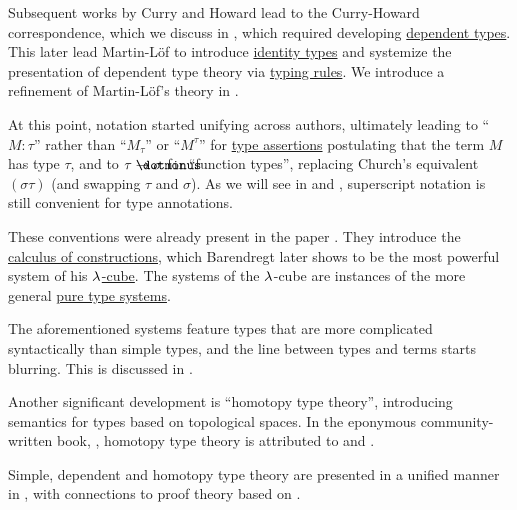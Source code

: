\begin{remark}
  Subsequent works by Curry and Howard lead to the Curry-Howard correspondence, which we discuss in , which required developing \hyperref[con:dependent_type]{dependent types}. This later lead Martin-Löf to introduce \hyperref[def:identity_type]{identity types} and systemize the presentation of dependent type theory via \hyperref[con:typing_rule]{typing rules}. We introduce a refinement of Martin-L\"of's theory in .

  At this point, notation started unifying across authors, ultimately leading to \enquote{\( M: \tau \)} rather than \enquote{\( M_\tau \)} or \enquote{\( M^\tau \)} for \hyperref[def:type_assertion]{type assertions} postulating that the term \( M \) has type \( \tau \), and to \( \tau \synimplies \sigma \) for \enquote{function types}, replacing Church's equivalent \( (\sigma\tau) \) (and swapping \( \tau \) and \( \sigma \)). As we will see in  and , superscript notation is still convenient for type annotations.

  These conventions were already present in the paper . They introduce the \hyperref[def:lambda_cube/combinations]{calculus of constructions}, which Barendregt later shows to be the most powerful system of his \hyperref[def:lambda_cube]{\( {\mathrm \lambda} \)-cube}. The systems of the \( {\mathrm \lambda} \)-cube are instances of the more general \hyperref[def:pure_type_system]{pure type systems}.

  The aforementioned systems feature types that are more complicated syntactically than simple types, and the line between types and terms starts blurring. This is discussed in .

  Another significant development is \enquote{homotopy type theory}, introducing semantics for types based on topological spaces. In the eponymous community-written book, \cite{UnivalentFoundationsProgram2024OctoberHoTT}, homotopy type theory is attributed to \cite{Voevodski2006HoTT} and \cite{AwodeyWarren2009HoTT}.
\end{remark}
\begin{comments}
  \item Simple, dependent and homotopy type theory are presented in a unified manner in \cite{Mimram2020ProgramEqualsProof}, with connections to proof theory based on .
\end{comments}

